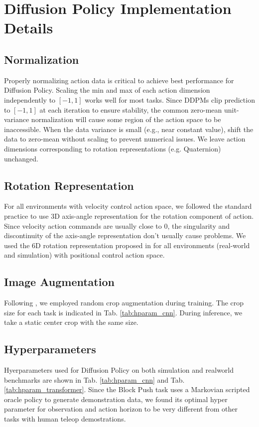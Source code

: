 \section{Diffusion Policy Implementation Details}

\subsection{Normalization}
Properly normalizing action data is critical to achieve best performance for Diffusion Policy.
Scaling the min and max of each action dimension independently to $[-1,1]$ works well for most tasks.
Since DDPMs clip prediction to $[-1,1]$ at each iteration to ensure stability, the common zero-mean unit-variance normalization will cause some region of the action space to be inaccessible.
When the data variance is small (e.g., near constant value), shift the data to zero-mean without scaling to prevent numerical issues.
We leave action dimensions corresponding to rotation representations (e.g. Quaternion) unchanged.



\subsection{Rotation Representation}
For all environments with velocity control action space, we followed the standard practice \cite{robomimic} to use 3D axis-angle representation for the rotation component of action. Since velocity action commands are usually close to 0, the singularity and discontinuity of the axis-angle representation don't usually cause problems. We used the 6D rotation representation proposed in \citet{zhou2019continuity} for all environments (real-world and simulation) with positional control action space.

\subsection{Image Augmentation}
Following \citet{robomimic}, we employed random crop augmentation during training. The crop size for each task is indicated in Tab. \ref{tab:hparam_cnn}. During inference, we take a static center crop with the same size.

\subsection{Hyperparameters}
Hyerparameters used for Diffusion Policy on both simulation and realworld benchmarks are shown in Tab. \ref{tab:hparam_cnn} and Tab. \ref{tab:hparam_transformer}. Since the Block Push task uses a Markovian scripted oracle policy to generate demonstration data, we found its optimal hyper parameter for observation and action horizon to be very different from other tasks with human teleop demostrations.

